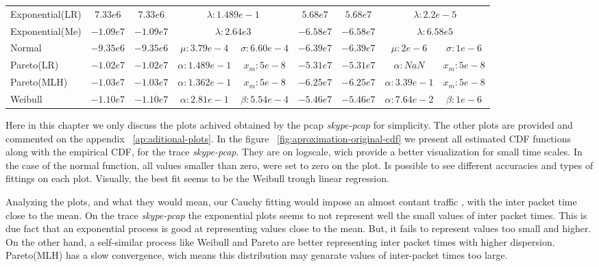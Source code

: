 \begin{table}[h!]
{\begin{tabular}{lcccccccc}
			Exponential(LR) & $7.33e6$    & $7.33e6$   & \multicolumn{2}{c}{$\lambda:1.489e-1$}   
			& $5.68e7$    & $ 5.68e7$  & \multicolumn{2}{c}{$\lambda:2.2e-5$}   \\
			Exponential(Me) & $-1.09e7$   & $-1.09e7$  & \multicolumn{2}{c}{$\lambda:2.64e3$}   
			& $-6.58e7$   & $-6.58e7$  & \multicolumn{2}{c}{$\lambda:6.58e5$} \\
			Normal          & $-9.35e6$   & $-9.35e6$  & $\mu:3.79e-4$   &$\sigma:6.60e-4$ 
			& $-6.39e7$   & $-6.39e7$  & $\mu:2e-6$     & $\sigma:1e-6$ \\
			Pareto(LR)      & $-1.02e7$   & $-1.02e7$  & $\alpha:1.489e-1 $ & $x_m:5e-8 $    
			& $-5.31e7$   & $-5.31e7$  & $\alpha:NaN$ & $x_m:5e-8 $    \\
			Pareto(MLH)     & $-1.03e7$   & $-1.03e7$  & $\alpha:1.362e-1$ & $x_m:5e-8 $    
			& $-6.25e7$   & $-6.25e7$  & $\alpha:3.39e-1$ & $x_m:5e-8 $    \\
			Weibull         & $-1.10e7$   & $-1.10e7$  & $\alpha:2.81e-1$ & $\beta:5.54e-4$  
			& $-5.46e7$   & $-5.46e7$  & $\alpha:7.64e-2$ & $\beta:1e-6$  \\ \hline
		\end{tabular}
	\label{tab:prototype-results}
	}
\end{table}

Here in this chapter we only discuss the plots achived obtained by the pcap \textit{skype-pcap} for simplicity. The other plots are provided and commented on the appendix ~\ref{ap:aditional-plots}. In the figure ~\ref{fig:aproximation-original-cdf} we present all estimated CDF functions along with the empirical CDF, for the trace \textit{skype-pcap}. They are on logscale, wich provide a better visualization for small time scales. In the case of the normal function, all values smaller than zero, were set to zero on the plot. Is possible to see different accuracies and types of fittings on each plot. Visually, the best fit seems to be the Weibull trough linear regression. 

Analyzing the plots, and what they would mean, our Cauchy fitting would impose an almost contant traffic , with the inter packet time close to the mean. On the trace \textit{skype-pcap} the exponential plots seems to not represent well the small values of inter packet times. This is due fact that an exponential process is good at representing values close to the mean. But, it fails to represent values too small and higher. On the other hand, a self-similar process like Weibull and Pareto are better representing inter packet times with higher dispersion. Pareto(MLH) has a slow convergence, wich means this distribution may genarate values of inter-packet times too large. 

